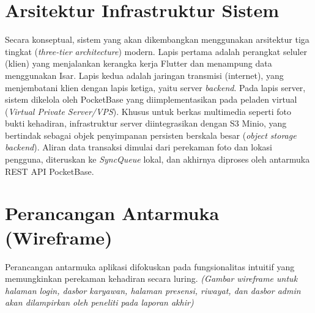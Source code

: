 \section{Arsitektur Infrastruktur Sistem}
Secara konseptual, sistem yang akan dikembangkan menggunakan arsitektur tiga tingkat (\textit{three-tier architecture}) modern. Lapis pertama adalah perangkat seluler (klien) yang menjalankan kerangka kerja Flutter dan menampung data menggunakan Isar. Lapis kedua adalah jaringan transmisi (internet), yang menjembatani klien dengan lapis ketiga, yaitu server \textit{backend}.
Pada lapis server, sistem dikelola oleh PocketBase yang diimplementasikan pada peladen virtual (\textit{Virtual Private Server/VPS}). Khusus untuk berkas multimedia seperti foto bukti kehadiran, infrastruktur server diintegrasikan dengan S3 Minio, yang bertindak sebagai objek penyimpanan persisten berskala besar (\textit{object storage backend}). Aliran data transaksi dimulai dari perekaman foto dan lokasi pengguna, diteruskan ke \textit{SyncQueue} lokal, dan akhirnya diproses oleh antarmuka REST API PocketBase.

\section{Perancangan Antarmuka (Wireframe)}
Perancangan antarmuka aplikasi difokuskan pada fungsionalitas intuitif yang memungkinkan perekaman kehadiran secara luring. 
\textit{(Gambar wireframe untuk halaman login, dasbor karyawan, halaman presensi, riwayat, dan dasbor admin akan dilampirkan oleh peneliti pada laporan akhir)}
